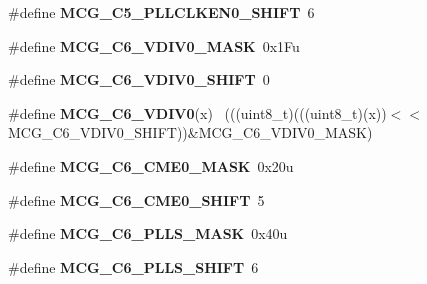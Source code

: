 \begin{DoxyCompactItemize}
\item 
\hypertarget{group___m_c_g___register___masks_gaa66ceed70e1055a31e46c60a502b8eb7}{}\#define {\bfseries M\+C\+G\+\_\+\+C5\+\_\+\+P\+L\+L\+C\+L\+K\+E\+N0\+\_\+\+S\+H\+I\+F\+T}~6\label{group___m_c_g___register___masks_gaa66ceed70e1055a31e46c60a502b8eb7}

\item 
\hypertarget{group___m_c_g___register___masks_gacf93ac207865bd372d9148f10dce7267}{}\#define {\bfseries M\+C\+G\+\_\+\+C6\+\_\+\+V\+D\+I\+V0\+\_\+\+M\+A\+S\+K}~0x1\+Fu\label{group___m_c_g___register___masks_gacf93ac207865bd372d9148f10dce7267}

\item 
\hypertarget{group___m_c_g___register___masks_ga92208f56fc7ce68a0a8ff14ab5c3b2f6}{}\#define {\bfseries M\+C\+G\+\_\+\+C6\+\_\+\+V\+D\+I\+V0\+\_\+\+S\+H\+I\+F\+T}~0\label{group___m_c_g___register___masks_ga92208f56fc7ce68a0a8ff14ab5c3b2f6}

\item 
\hypertarget{group___m_c_g___register___masks_gaa423a05479c6b93636da999ad7738cec}{}\#define {\bfseries M\+C\+G\+\_\+\+C6\+\_\+\+V\+D\+I\+V0}(x)                                                ~(((uint8\+\_\+t)(((uint8\+\_\+t)(x))$<$$<$M\+C\+G\+\_\+\+C6\+\_\+\+V\+D\+I\+V0\+\_\+\+S\+H\+I\+F\+T))\&M\+C\+G\+\_\+\+C6\+\_\+\+V\+D\+I\+V0\+\_\+\+M\+A\+S\+K)\label{group___m_c_g___register___masks_gaa423a05479c6b93636da999ad7738cec}

\item 
\hypertarget{group___m_c_g___register___masks_ga2e0daa102ec3f225ed9297f7bc9f8239}{}\#define {\bfseries M\+C\+G\+\_\+\+C6\+\_\+\+C\+M\+E0\+\_\+\+M\+A\+S\+K}~0x20u\label{group___m_c_g___register___masks_ga2e0daa102ec3f225ed9297f7bc9f8239}

\item 
\hypertarget{group___m_c_g___register___masks_ga096e62e71f69f5b749999d671d800090}{}\#define {\bfseries M\+C\+G\+\_\+\+C6\+\_\+\+C\+M\+E0\+\_\+\+S\+H\+I\+F\+T}~5\label{group___m_c_g___register___masks_ga096e62e71f69f5b749999d671d800090}

\item 
\hypertarget{group___m_c_g___register___masks_ga66a1dfdde86a9c165d7bdec17c77578f}{}\#define {\bfseries M\+C\+G\+\_\+\+C6\+\_\+\+P\+L\+L\+S\+\_\+\+M\+A\+S\+K}~0x40u\label{group___m_c_g___register___masks_ga66a1dfdde86a9c165d7bdec17c77578f}

\item 
\hypertarget{group___m_c_g___register___masks_ga690a1869788f450cfa53d73f983a1c05}{}\#define {\bfseries M\+C\+G\+\_\+\+C6\+\_\+\+P\+L\+L\+S\+\_\+\+S\+H\+I\+F\+T}~6\label{group___m_c_g___register___masks_ga690a1869788f450cfa53d73f983a1c05}


\end{DoxyCompactItemize}

